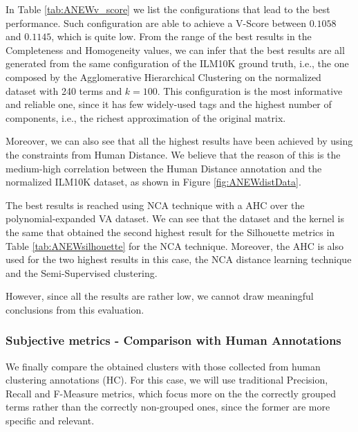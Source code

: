 In Table \ref{tab:ANEWv_score} we list the configurations that lead to the best performance. Such configuration are able to achieve a V-Score between $0.1058$ and $0.1145$, which is quite low. From the range of the best results in the Completeness and Homogeneity values, we can infer that the best results are all generated from the same configuration of the ILM10K ground truth, i.e., the one composed by the Agglomerative Hierarchical Clustering on the normalized dataset with 240 terms and $k=100$. This configuration is the most informative and reliable one, since it has few widely-used tags and the highest number of components, i.e., the richest approximation of the original matrix.  

Moreover, we can also see that all the highest results have been achieved by using the constraints from Human Distance. We believe that the reason of this is the medium-high correlation between the Human Distance annotation and the normalized ILM10K dataset, as shown in Figure \ref{fig:ANEWdistData}.

The best results is reached using NCA technique with a AHC over the polynomial-expanded VA dataset. We can see that the dataset and the kernel is the same that obtained the second highest result for the Silhouette metrics in Table \ref{tab:ANEWsilhouette} for the NCA technique. Moreover, the AHC is also used for the two highest results in this case, the NCA distance learning technique and the Semi-Supervised clustering.

However, since all the results are rather low, we cannot draw meaningful conclusions from this evaluation.

\subsubsection{Subjective metrics - Comparison with Human Annotations}
\label{sec:ANEW:subHC_results}
We finally compare the obtained clusters with those collected from human clustering annotations (HC). For this case, we will use traditional Precision, Recall and F-Measure metrics, which focus more on the the correctly grouped terms rather than the correctly non-grouped ones, since the former are more specific and relevant.

